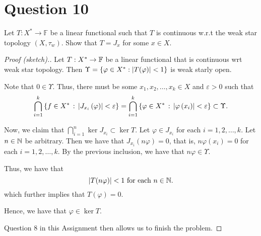 \section{Question 10}
\horz

Let $T: X^* \to \mathbb F$ be a linear functional such that $T$ is continuous w.r.t the weak star topology $(X,\tau_w).$ Show that $T= J_x$ for some $x\in X.$ 

\horz

\begin{proof}[Proof (sketch).]
    Let $T: X^{*} \to \mathbb F$ be a linear functional that is continuous wrt weak star topology. Then $\Upsilon = \left\{ \varphi \in X^{*} : \left\lvert T(\varphi) \right\rvert < 1 \right\}$ is weak starly open.

    Note that $0 \in \Upsilon$. Thus, there must be some $x_{1}, x_{2}, \ldots, x_{k} \in X$ and $\varepsilon > 0$ such that 
    \begin{equation*}
	\bigcap_{i=1}^{k} \left\{ f \in X^{*} \, : \, \left\lvert J_{x_{i}}\left( \varphi \right) \right\rvert < \varepsilon  \right\} = \bigcap_{i=1}^{k} \left\{ \varphi \in X^{*} \, : \, \left\lvert \varphi \left( x_{i} \right) \right\rvert < \varepsilon  \right\}\subset \Upsilon.
    \end{equation*}

    Now, we claim that $\bigcap_{i=1}^{n} \ker J_{x_{i}} \subset \ker T$. Let $\varphi \in J_{x_{i}}$ for each $i=1,2, \ldots , k$. Let $n\in \mathbb N$ be arbitrary. Then we have that $J_{x_{i}} \left( n\varphi \right) = 0$, that is, $n\varphi \left( x_{i} \right) = 0$ for each $i=1,2,\ldots, k$. By the previous inclusion, we have that $n\varphi \in \Upsilon$.

    Thus, we have that
    \begin{equation*}
	\left\lvert T(n\varphi ) \right\rvert < 1 \text{ for each } n\in \mathbb N.
    \end{equation*}
    which further implies that $T\left( \varphi \right) = 0$.

    Hence, we have that $\varphi \in \ker T$.
    
    Question 8 in this Assignment then allows us to finish the problem.
\end{proof}
